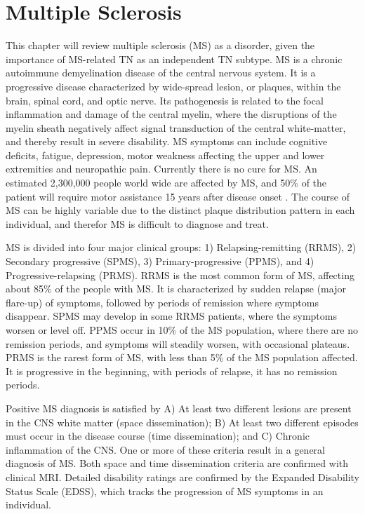 \section{Multiple Sclerosis}
This chapter will review multiple sclerosis (MS) as a disorder, given the importance of MS-related TN as an independent TN subtype. MS is a chronic autoimmune demyelination disease of the central nervous system. It is a progressive disease characterized by wide-spread lesion, or plaques, within the brain, spinal cord, and optic nerve. Its pathogenesis is related to the focal inflammation and damage of the central myelin, where the disruptions of the myelin sheath negatively affect signal transduction of the central white-matter, and thereby result in severe disability. MS symptoms can include cognitive deficits, fatigue, depression, motor weakness affecting the upper and lower extremities and neuropathic pain. Currently there is no cure for MS. An estimated 2,300,000 people world wide are affected by MS, and 50\% of the patient will require motor assistance 15 years after disease onset \cite{Goldenberg2012}. The course of MS can be highly variable due to the distinct plaque distribution pattern in each individual, and therefor MS is difficult to diagnose and treat.

MS is divided into four major clinical groups: 1) Relapsing-remitting (RRMS), 2) Secondary progressive (SPMS), 3) Primary-progressive (PPMS), and 4) Progressive-relapsing (PRMS). RRMS is the most common form of MS, affecting about 85\% of the people with MS. It is characterized by sudden relapse (major flare-up) of symptoms, followed by periods of remission where symptoms disappear. SPMS may develop in some RRMS patients, where the symptoms worsen or level off. PPMS occur in 10\% of the MS population, where there are no remission periods, and symptoms will steadily worsen, with occasional plateaus. PRMS is the rarest form of MS, with less than 5\% of the MS population affected. It is progressive in the beginning, with periods of relapse, it has no remission periods. 

Positive MS diagnosis is satisfied by A) At least two different lesions are present in the CNS white matter (space dissemination); B) At least two different episodes must occur in the disease course (time dissemination); and C) Chronic inflammation of the CNS. One or more of these criteria result in a general diagnosis of MS. Both space and time dissemination criteria are confirmed with clinical MRI. Detailed disability ratings are confirmed by the Expanded Disability Status Scale (EDSS)\cite{Kurtzke1983}, which tracks the progression of MS symptoms in an individual.

